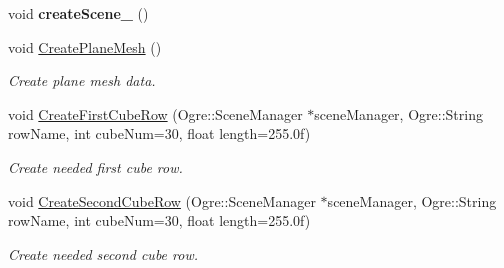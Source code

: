 \begin{DoxyCompactItemize}
\item 
void {\bfseries create\+Scene\+\_} ()\hypertarget{class_basic_tutorial__00_aad14e1ca565797c4b7dcff31bc0e1494}{}\label{class_basic_tutorial__00_aad14e1ca565797c4b7dcff31bc0e1494}

\item 
void \hyperlink{class_basic_tutorial__00_adc00264bf47afe1b689c04d7e7ded79a}{Create\+Plane\+Mesh} ()\hypertarget{class_basic_tutorial__00_adc00264bf47afe1b689c04d7e7ded79a}{}\label{class_basic_tutorial__00_adc00264bf47afe1b689c04d7e7ded79a}

\begin{DoxyCompactList}\small\item\em Create plane mesh data. \end{DoxyCompactList}\item 
void \hyperlink{class_basic_tutorial__00_a85d22e164f65d875ed6e819316efb534}{Create\+First\+Cube\+Row} (Ogre\+::\+Scene\+Manager $\ast$scene\+Manager, Ogre\+::\+String row\+Name, int cube\+Num=30, float length=255.\+0f)
\begin{DoxyCompactList}\small\item\em Create needed first cube row. \end{DoxyCompactList}\item 
void \hyperlink{class_basic_tutorial__00_af24f6ce5c00cade7cabf19acdde8d45a}{Create\+Second\+Cube\+Row} (Ogre\+::\+Scene\+Manager $\ast$scene\+Manager, Ogre\+::\+String row\+Name, int cube\+Num=30, float length=255.\+0f)
\begin{DoxyCompactList}\small\item\em Create needed second cube row. \end{DoxyCompactList}\end{DoxyCompactItemize}
